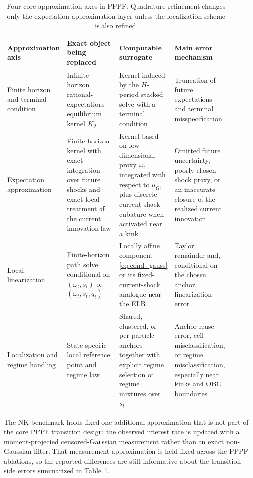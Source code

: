 \documentclass[11pt]{article}
\theoremstyle{remark}
\begin{document}
\begin{table}[t]
\centering
\small
\begin{tabular}{p{0.17\linewidth} p{0.26\linewidth} p{0.24\linewidth} p{0.23\linewidth}}
\toprule
Approximation axis & Exact object being replaced & Computable surrogate & Main error mechanism \\
\midrule
Finite horizon and terminal condition & Infinite-horizon rational-expectations equilibrium kernel $K_\theta$ & Kernel induced by the $H$-period stacked solve with a terminal condition & Truncation of future expectations and terminal misspecification \\
Expectation approximation & Finite-horizon kernel with exact integration over future shocks and exact local treatment of the current innovation law & Kernel based on low-dimensional proxy $\omega_t$ integrated with respect to $\mu_\Omega$, plus discrete current-shock cubature when activated near a kink & Omitted future uncertainty, poorly chosen shock proxy, or an inaccurate closure of the realized current innovation \\
Local linearization & Finite-horizon path solve conditional on $(\omega_t,s_t)$ or $(\omega_t,s_t,q_t)$ & Locally affine component \eqref{eq:cond_gauss} or its fixed-current-shock analogue near the ELB & Taylor remainder and, conditional on the chosen anchor, linearization error \\
Localization and regime handling & State-specific local reference point and regime law & Shared, clustered, or per-particle anchors together with explicit regime selection or regime mixtures over $s_t$ & Anchor-reuse error, cell misclassification, or regime misclassification, especially near kinks and OBC boundaries \\
\bottomrule
\end{tabular}
\caption{Four core approximation axes in PPPF. Quadrature refinement changes only the expectation-approximation layer unless the localization scheme is also refined.}
\label{tab:approx_taxonomy}
\end{table}

The NK benchmark holds fixed one additional approximation that is not part of the core PPPF transition design: the observed interest rate is updated with a moment-projected censored-Gaussian measurement rather than an exact non-Gaussian filter.
That measurement approximation is held fixed across the PPPF ablations, so the reported differences are still informative about the transition-side errors summarized in Table~\ref{tab:approx_taxonomy}.
\end{document}
